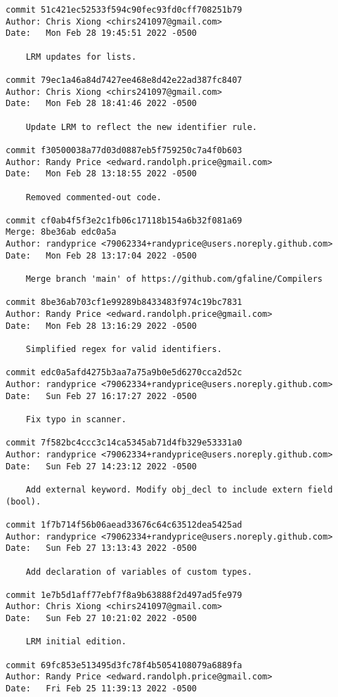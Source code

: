{\begin{verbatim}
commit 51c421ec52533f594c90fec93fd0cff708251b79
Author: Chris Xiong <chirs241097@gmail.com>
Date:   Mon Feb 28 19:45:51 2022 -0500

    LRM updates for lists.

commit 79ec1a46a84d7427ee468e8d42e22ad387fc8407
Author: Chris Xiong <chirs241097@gmail.com>
Date:   Mon Feb 28 18:41:46 2022 -0500

    Update LRM to reflect the new identifier rule.

commit f30500038a77d03d0887eb5f759250c7a4f0b603
Author: Randy Price <edward.randolph.price@gmail.com>
Date:   Mon Feb 28 13:18:55 2022 -0500

    Removed commented-out code.

commit cf0ab4f5f3e2c1fb06c17118b154a6b32f081a69
Merge: 8be36ab edc0a5a
Author: randyprice <79062334+randyprice@users.noreply.github.com>
Date:   Mon Feb 28 13:17:04 2022 -0500

    Merge branch 'main' of https://github.com/gfaline/Compilers

commit 8be36ab703cf1e99289b8433483f974c19bc7831
Author: Randy Price <edward.randolph.price@gmail.com>
Date:   Mon Feb 28 13:16:29 2022 -0500

    Simplified regex for valid identifiers.

commit edc0a5afd4275b3aa7a75a9b0e5d6270cca2d52c
Author: randyprice <79062334+randyprice@users.noreply.github.com>
Date:   Sun Feb 27 16:17:27 2022 -0500

    Fix typo in scanner.

commit 7f582bc4ccc3c14ca5345ab71d4fb329e53331a0
Author: randyprice <79062334+randyprice@users.noreply.github.com>
Date:   Sun Feb 27 14:23:12 2022 -0500

    Add external keyword. Modify obj_decl to include extern field (bool).

commit 1f7b714f56b06aead33676c64c63512dea5425ad
Author: randyprice <79062334+randyprice@users.noreply.github.com>
Date:   Sun Feb 27 13:13:43 2022 -0500

    Add declaration of variables of custom types.

commit 1e7b5d1aff77ebf7f8a9b63888f2d497ad5fe979
Author: Chris Xiong <chirs241097@gmail.com>
Date:   Sun Feb 27 10:21:02 2022 -0500

    LRM initial edition.

commit 69fc853e513495d3fc78f4b5054108079a6889fa
Author: Randy Price <edward.randolph.price@gmail.com>
Date:   Fri Feb 25 11:39:13 2022 -0500


\end{verbatim}}
